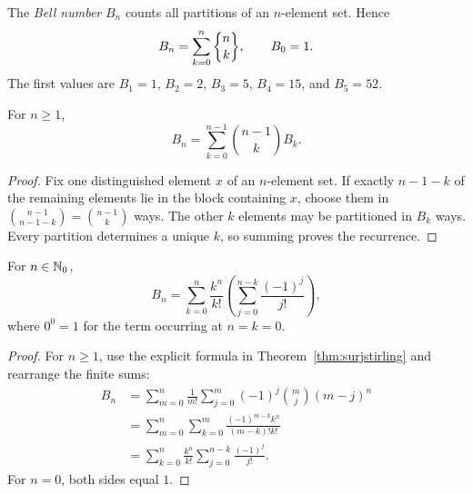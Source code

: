 \documentclass[11pt, oneside]{article}
\begin{document}
\begin{definition}
The \emph{Bell number} $B_n$ counts all partitions of an $n$-element set. Hence
\[
B_n=\sum_{k=0}^n\stirtwo{n}{k}, \qquad B_0=1.
\]
The first values are $B_1=1$, $B_2=2$, $B_3=5$, $B_4=15$, and $B_5=52$.
\end{definition}
\begin{theorem}\label{thm:bellrec}
For $n\ge1$,
\[
B_n=\sum_{k=0}^{n-1}\binom{n-1}{k}B_k.
\]
\end{theorem}
\begin{proof}
Fix one distinguished element $x$ of an $n$-element set. If exactly $n-1-k$ of the remaining elements lie in the block containing $x$, choose them in $\binom{n-1}{n-1-k}=\binom{n-1}{k}$ ways. The other $k$ elements may be partitioned in $B_k$ ways. Every partition determines a unique $k$, so summing proves the recurrence.
\end{proof}
\begin{theorem}\label{thm:bellsum}
For $n\in\mathbb{N}_0$,
\[
B_n=\sum_{k=0}^n\frac{k^n}{k!}
\left(\sum_{j=0}^{n-k}\frac{(-1)^j}{j!}\right),
\]
where $0^0=1$ for the term occurring at $n=k=0$.
\end{theorem}
\begin{proof}
For $n\ge1$, use the explicit formula in Theorem~\ref{thm:surjstirling} and rearrange the finite sums:
\[
\begin{aligned}
B_n
&=\sum_{m=0}^n\frac1{m!}\sum_{j=0}^m(-1)^j\binom mj(m-j)^n\\
&=\sum_{m=0}^n\sum_{k=0}^m\frac{(-1)^{m-k}k^n}{(m-k)!k!}\\
&=\sum_{k=0}^n\frac{k^n}{k!}\sum_{j=0}^{n-k}\frac{(-1)^j}{j!}.
\end{aligned}
\]
For $n=0$, both sides equal $1$.
\end{proof}
\end{document}
